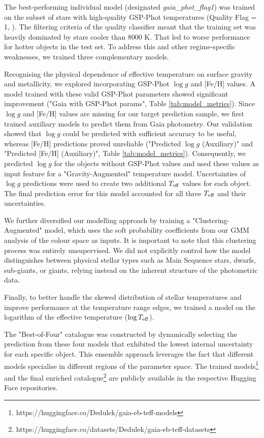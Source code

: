 \documentclass[preprint,12pt,authoryear]{elsarticle}
\begin{document}
The best-performing individual model (designated \textit{gaia\_phot\_flag1}) was trained on the subset of stars with high-quality GSP-Phot temperatures (Quality Flag = 1, \cite{Avdeeva2024}). 
The filtering criteria of the quality classifier meant that the training set was heavily dominated by stars cooler than 8000 K.
That led to worse performance for hotter objects in the test set. 
To address this and other regime-specific weaknesses, we trained three complementary models.

Recognising the physical dependence of effective temperature on surface gravity and metallicity, we explored incorporating GSP-Phot $\log g$ and [Fe/H] values. 
A model trained with these valid GSP-Phot parameters showed significant improvement ("Gaia with GSP-Phot params", Table \ref{tab:model_metrics}). 
Since $\log g$ and [Fe/H] values are missing for our target prediction sample, we first trained auxiliary models to predict them from Gaia photometry. 
Our validation showed that $\log g$ could be predicted with sufficient accuracy to be useful, whereas [Fe/H] predictions proved unreliable ("Predicted $\log g$ (Auxiliary)" and "Predicted [Fe/H] (Auxiliary)", Table \ref{tab:model_metrics}). 
Consequently, we predicted $\log g$ for the objects without GSP-Phot values and used these values as input feature for a "Gravity-Augmented" temperature model. Uncertainties of $\log g$ predictions were used to create two additional $T_{\rm eff}$ values for each object. The final prediction error for this model accounted for all three $T_{\rm eff}$ and their uncertainties. 

We further diversified our modelling approach by training a "Clustering-Augmented" model, which uses the soft probability coefficients from our GMM analysis of the colour space as inputs.
It is important to note that this clustering process was entirely unsupervised.
We did not explicitly control how the model distinguishes between physical stellar types such as Main Sequence stars, dwarfs, sub-giants, or giants, relying instead on the inherent structure of the photometric data. 

Finally, to better handle the skewed distribution of stellar temperatures and improve performance at the temperature range edges, we trained a model on the logarithm of the effective temperature ($\log T_{\rm eff}$).

The "Best-of-Four" catalogue was constructed by dynamically selecting the prediction from these four models that exhibited the lowest internal uncertainty for each specific object. 
This ensemble approach leverages the fact that different models specialise in different regions of the parameter space. 
The trained models\footnote{https://huggingface.co/Dedulek/gaia-eb-teff-models} and the final enriched catalogue\footnote{ https://huggingface.co/datasets/Dedulek/gaia-eb-teff-datasets} are publicly available in the respective Hugging Face repositories.
\end{document}
